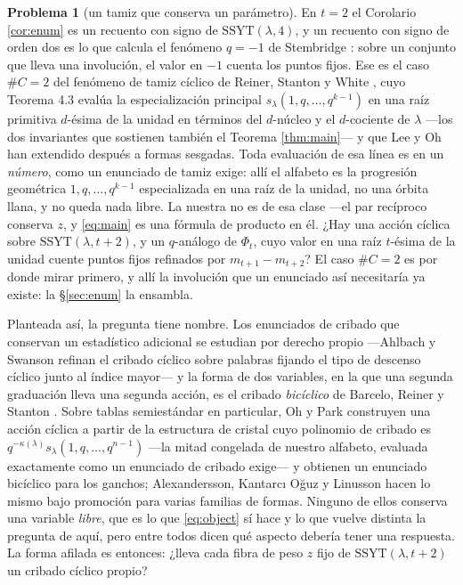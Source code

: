 \documentclass[11pt,reqno]{amsart}
\theoremstyle{plain}
\theoremstyle{definition}
\newtheorem{problem}[theorem]{Problema}
\begin{document}
\begin{problem}[un tamiz que conserva un parámetro]\label{prob:sieving}
En $t=2$ el Corolario \ref{cor:enum} es un recuento con signo de $\mathrm{SSYT}(\lambda,4)$, y un
recuento con signo de orden dos es lo que calcula el fenómeno $q=-1$ de Stembridge \cite{Ste94}:
sobre un conjunto que lleva una involución, el valor en $-1$ cuenta los puntos fijos. Ese es el caso
$\#C=2$ del fenómeno de tamiz cíclico de Reiner, Stanton y White \cite{RSW04}, cuyo Teorema 4.3
evalúa la especialización principal $s_\lambda(1,q,\dots,q^{k-1})$ en una raíz primitiva $d$-ésima
de la unidad en términos del $d$-núcleo y el $d$-cociente de $\lambda$ ---los dos invariantes que
sostienen también el Teorema \ref{thm:main}--- y que Lee y Oh \cite{LO22} han extendido después a
formas sesgadas. Toda evaluación de esa línea es en un \emph{número}, como un enunciado de tamiz
exige: allí el alfabeto es la progresión geométrica $1,q,\dots,q^{k-1}$ especializada en una raíz de
la unidad, no una órbita llana, y no queda nada libre. La nuestra no es de esa clase ---el par
recíproco conserva $z$, y \eqref{eq:main} es una fórmula de producto en él. ¿Hay una acción cíclica
sobre $\mathrm{SSYT}(\lambda,t+2)$, y un $q$-análogo de $\Phi_t$, cuyo valor en una raíz $t$-ésima
de la unidad cuente puntos fijos refinados por $m_{t+1}-m_{t+2}$? El caso $\#C=2$ es por donde mirar
primero, y allí la involución que un enunciado así necesitaría ya existe: la \S\ref{sec:enum} la
ensambla.

Planteada así, la pregunta tiene nombre. Los enunciados de cribado que conservan un estadístico
adicional se estudian por derecho propio ---Ahlbach y Swanson \cite{AS18} refinan el cribado cíclico
sobre palabras fijando el tipo de descenso cíclico junto al índice mayor--- y la forma de dos
variables, en la que una segunda graduación lleva una segunda acción, es el cribado \emph{bicíclico}
de Barcelo, Reiner y Stanton \cite{BRS08}. Sobre tablas semiestándar en particular, Oh y Park
\cite{OP19} construyen una acción cíclica a partir de la estructura de cristal cuyo polinomio de
cribado es $q^{-\kappa(\lambda)}s_\lambda(1,q,\dots,q^{n-1})$ ---la mitad congelada de nuestro
alfabeto, evaluada exactamente como un enunciado de cribado exige--- y obtienen un enunciado
bicíclico para los ganchos; Alexandersson, Kantarc\i{} O\u{g}uz y Linusson \cite{AKL21} hacen lo
mismo bajo promoción para varias familias de formas. Ninguno de ellos conserva una variable
\emph{libre}, que es lo que \eqref{eq:object} sí hace y lo que vuelve distinta la pregunta de aquí,
pero entre todos dicen qué aspecto debería tener una respuesta. La forma afilada es entonces: ¿lleva
cada fibra de peso $z$ fijo de $\mathrm{SSYT}(\lambda,t+2)$ un cribado cíclico propio?


\end{problem}
\end{document}
